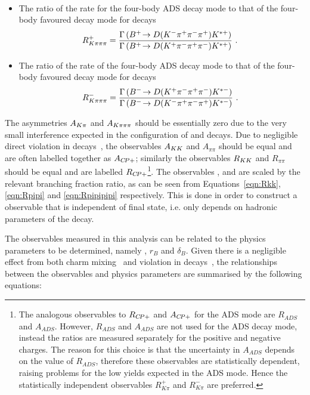 \begin{itemize}
{{\begin{multline}
\label{eqn:Rpipipipi}
\end{multline}}}
\item{The ratio of the rate for the four-body ADS decay mode to that of the four-body favoured decay mode for \Bp decays
\begin{equation}
R^+_{K\pi\pi\pi} = \frac{\Gamma\left({{{B}^+}}\!\rightarrow {\ensuremath{D}}({{K}^-}{{\pi}^+}{{\pi}^-}{{\pi}^+}){{K}^{*+}}\right)}{\Gamma\left({{{B}^+}}\!\rightarrow {\ensuremath{D}}({{K}^+}{{\pi}^-}{{\pi}^+}{{\pi}^-}){{K}^{*+}}\right)} \text{ . }
\label{eqn:Rplus4body}
\end{equation}
}
\item{The ratio of the rate of the four-body ADS decay mode to that of the four-body favoured decay mode for \Bm decays
\begin{equation}
R^-_{K\pi\pi\pi} = \frac{\Gamma\left({{{B}^-}}\!\rightarrow {\ensuremath{D}}({{K}^+}{{\pi}^-}{{\pi}^+}{{\pi}^-}){{K}^{*-}}\right)}{\Gamma\left({{{B}^-}}\!\rightarrow {\ensuremath{D}}({{K}^-}{{\pi}^+}{{\pi}^-}{{\pi}^+}){{K}^{*-}}\right)} \text{ . }
\label{eqn:Rminus4body}
\end{equation}
}
\end{itemize}

\noindent
The asymmetries $A_{{K}\pi}$ and $A_{{K}\pi\pi\pi}$ should be essentially zero due to the very small interference expected in the configuration of \B and \D decays. Due to negligible direct \CP violation in \D decays~\cite{charmcpv}, the observables $A_{{K}{K}}$ and $A_{\pi\pi}$ should be equal and are often labelled together as $A_{{C\!P}+}$; similarly the observables $R_{{K}{K}}$ and $R_{\pi\pi}$ should be equal and are labelled $R_{{C\!P}+}$\footnote{The analogous observables to $R_{{C\!P}+}$ and $A_{{C\!P}+}$ for the ADS mode are $R_{ADS}$ and $A_{ADS}$. However, $R_{ADS}$ and $A_{ADS}$ are not used for the ADS decay mode, instead the ratios are measured separately for the positive and negative charges. The reason for this choice is that the uncertainty in $A_{ADS}$ depends on the value of $R_{ADS}$, therefore these observables are statistically dependent, raising problems for the low yields expected in the ADS mode. Hence the statistically independent observables $R^+_{K\pi}$ and $R^-_{K\pi}$ are preferred.}. The observables \Rkk, \Rpipi and \Rpipipipi are scaled by the relevant branching fraction ratio, as can be seen from Equations~\ref{eqn:Rkk}, \ref{eqn:Rpipi} and \ref{eqn:Rpipipipi} respectively. This is done in order to construct a \CP observable that is independent of final state, i.e. only depends on hadronic parameters of the \Bm decay. 

The \CP observables measured in this analysis can be related to the physics parameters to be determined, namely \Pgamma, $r_B$ and $\delta_B$. Given there is a negligible effect from both charm mixing~\cite{charmmixing} and \CP violation in \D decays~\cite{charmcpv}, the relationships between the \CP observables and physics parameters are summarised by the following equations:

